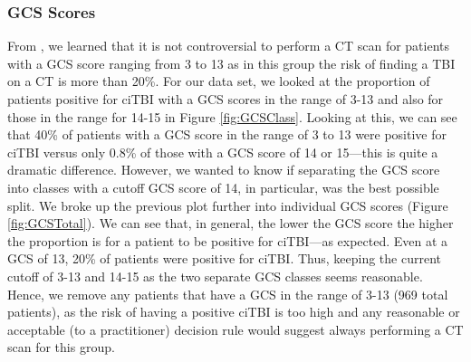 \documentclass[11pt, letterpaper]{amsart}
\let\Oldsubsubsection\subsubsection
\renewcommand{\subsubsection}{\FloatBarrier\Oldsubsubsection}
\begin{document}
\subsubsection{GCS Scores}

From \cite{kuppermann2009identification}, we learned that it is not controversial to perform a CT scan for patients with a GCS score ranging from 3 to 13 as in this group the risk of finding a TBI on a CT is more than 20\%. For our data set, we looked at the proportion of patients positive for ciTBI with a GCS scores in the range of 3-13 and also for those in the range for 14-15 in Figure \ref{fig:GCSClass}. Looking at this, we can see that 40\% of patients with a GCS score in the range of 3 to 13 were positive for ciTBI versus only 0.8\% of those with a GCS score of 14 or 15---this is quite a dramatic difference. However, we wanted to know if separating the GCS score into classes with a cutoff GCS score of 14, in particular, was the best possible split. We broke up the previous plot further into individual GCS scores (Figure \ref{fig:GCSTotal}). We can see that, in general, the lower the GCS score the higher the proportion is for a patient to be positive for ciTBI---as expected. Even at a GCS of 13, 20\% of patients were positive for ciTBI. Thus, keeping the current cutoff of 3-13 and 14-15 as the two separate GCS classes seems reasonable. Hence, we remove any patients that have a GCS in the range of 3-13 (969 total patients), as the risk of having a positive ciTBI is too high and any reasonable or acceptable (to a practitioner) decision rule would suggest always performing a CT scan for this group.
\end{document}
